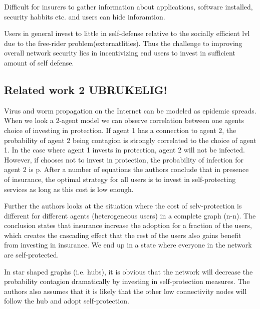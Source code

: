  Difficult for insurers to gather information about applications, software installed, security habbits
  etc. and users can hide inforamtion.
 
Users in general invest to little in self-defense relative to the socially efficient lvl due to the
 free-rider problem(externatlities).  Thus the challenge to improving overall network security lies in
  incentivizing end users to invest in sufficient amount of self defense.
  
  
  
  
\subsection{Related work 2 UBRUKELIG!}
Virus and worm propagation on the Internet can be modeled as epidemic spreads. 
When we look a 2-agent model we can observe correlation between one agents choice of investing in 
protection. If agent 1 has a connection to agent 2, the probability of agent 2 being contagion is 
strongly correlated to the choice of agent 1. In the case where agent 1 invests in protection,
 agent 2 will not be infected. However, if chooses not to invest in protection, the probability 
 of infection for agent 2 is p.
 After a number of equations the authors conclude that in presence of insurance, the optimal 
 strategy for all users is to invest in self-protecting services as long as this cost is low
  enough.

Further the authors looks at the situation where the cost of selv-protection is different for 
different agents (heterogeneous users) in a complete graph (n-n). The conclusion states that
 insurance increase the adoption for a fraction of the users, which creates the cascading effect
 that the rest of the users also gains benefit from investing in insurance. We end up in a state
  where everyone in the network are self-protected. 

In star shaped graphs (i.e. hubs), it is obvious that the network will decrease the probability
 contagion dramatically by investing in self-protection measures. The authors also assumes that it
 is likely that the other low connectivity nodes will follow the hub and adopt self-protection. 